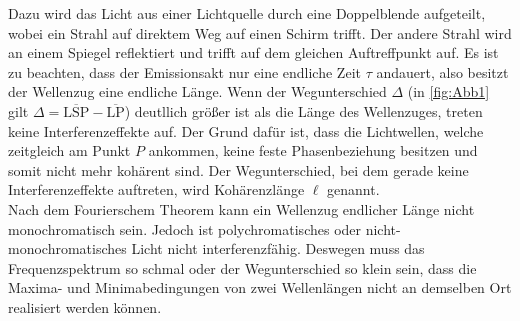 Dazu wird das Licht aus einer Lichtquelle durch eine Doppelblende aufgeteilt, wobei ein Strahl auf direktem Weg auf einen Schirm trifft.
Der andere Strahl wird an einem Spiegel reflektiert und trifft auf dem gleichen Auftreffpunkt auf.
Es ist zu beachten, dass der Emissionsakt nur eine endliche Zeit $\tau$ andauert, also besitzt der Wellenzug eine endliche Länge.
Wenn der Wegunterschied $\Delta$ (in \autoref{fig:Abb1} gilt $\Delta = \overline{\text{LSP}} - \overline{\text{LP}} $) deutllich größer ist 
als die Länge des Wellenzuges, treten keine Interferenzeffekte auf.
Der Grund dafür ist, dass die Lichtwellen, welche zeitgleich am Punkt $P$ ankommen, keine feste Phasenbeziehung besitzen und somit nicht
mehr kohärent sind.
Der Wegunterschied, bei dem gerade keine Interferenzeffekte auftreten, wird Kohärenzlänge $\ell$ genannt.\\
Nach dem Fourierschem Theorem kann ein Wellenzug endlicher Länge nicht monochromatisch sein.
Jedoch ist polychromatisches oder nicht-monochromatisches Licht nicht interferenzfähig.
Deswegen muss das Frequenzspektrum so schmal oder der Wegunterschied so klein sein, dass die Maxima- und Minimabedingungen von zwei Wellenlängen
nicht an demselben Ort realisiert werden können.

